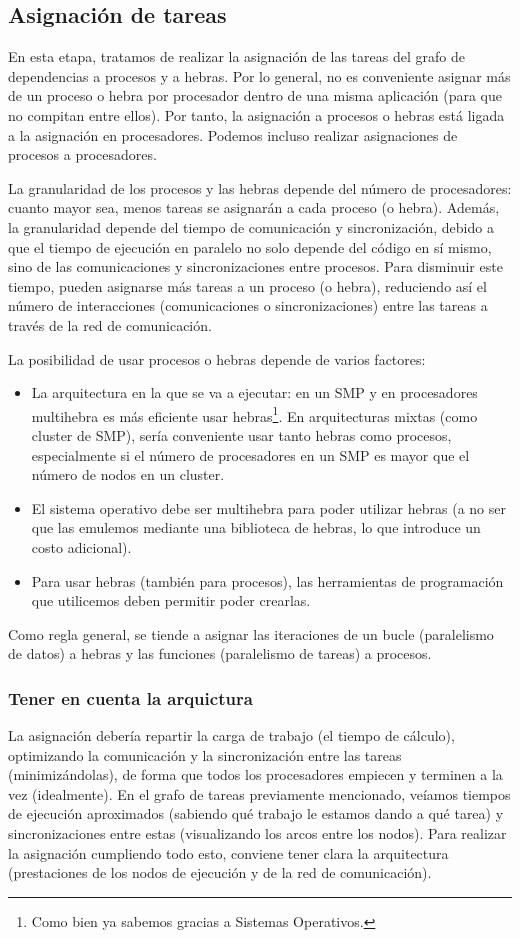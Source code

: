 \subsection{Asignación de tareas} 
En esta etapa, tratamos de realizar la asignación de las tareas del grafo de dependencias a procesos y a hebras. Por lo general, no es conveniente asignar más de un proceso o hebra por procesador dentro de una misma aplicación (para que no compitan entre ellos). Por tanto, la asignación a procesos o hebras está ligada a la asignación en procesadores. Podemos incluso realizar asignaciones de procesos a procesadores. 

La granularidad de los procesos y las hebras depende del número de procesadores: cuanto mayor sea, menos tareas se asignarán a cada proceso (o hebra). Además, la granularidad depende del tiempo de comunicación y sincronización, debido a que el tiempo de ejecución en paralelo no solo depende del código en sí mismo, sino de las comunicaciones y sincronizaciones entre procesos. Para disminuir este tiempo, pueden asignarse más tareas a un proceso (o hebra), reduciendo así el número de interacciones (comunicaciones o sincronizaciones) entre las tareas a través de la red de comunicación. 

La posibilidad de usar procesos o hebras depende de varios factores:
\begin{itemize}
    \item La arquitectura en la que se va a ejecutar: en un SMP y en procesadores multihebra es más eficiente usar hebras\footnote{Como bien ya sabemos gracias a Sistemas Operativos.}. En arquitecturas mixtas (como cluster de SMP), sería conveniente usar tanto hebras como procesos, especialmente si el número de procesadores en un SMP es mayor que el número de nodos en un cluster.
    \item El sistema operativo debe ser multihebra para poder utilizar hebras (a no ser que las emulemos mediante una biblioteca de hebras, lo que introduce un costo adicional).
    \item Para usar hebras (también para procesos), las herramientas de programación que utilicemos deben permitir poder crearlas.
\end{itemize}
Como regla general, se tiende a asignar las iteraciones de un bucle (paralelismo de datos) a hebras y las funciones (paralelismo de tareas) a procesos.

\subsubsection{Tener en cuenta la arquictura}
La asignación debería repartir la carga de trabajo (el tiempo de cálculo), optimizando la comunicación y la sincronización entre las tareas (minimizándolas), de forma que todos los procesadores empiecen y terminen a la vez (idealmente). En el grafo de tareas previamente mencionado, veíamos tiempos de ejecución aproximados (sabiendo qué trabajo le estamos dando a qué tarea) y sincronizaciones entre estas (visualizando los arcos entre los nodos). Para realizar la asignación cumpliendo todo esto, conviene tener clara la arquitectura (prestaciones de los nodos de ejecución y de la red de comunicación).


